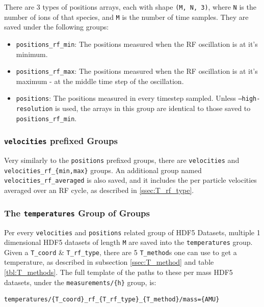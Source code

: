There are 3 types of positions arrays, each with shape \texttt{(M, N, 3)}, where \texttt{N} is the number of ions of that species, and \texttt{M} is the number of time samples. They are saved under the following groups:

\begin{itemize}
	\item \texttt{positions\_rf\_min}: The positions measured when the RF oscillation is at it's minimum.
	\item \texttt{positions\_rf\_max}: The positions measured when the RF oscillation is at it's maximum - at the middle time step of the oscillation.
	\item \texttt{positions}: The positions measured in every timestep sampled. Unless \texttt{--high-resolution} is used, the arrays in this group are identical to those saved to \texttt{positions\_rf\_min}.
\end{itemize}

\subsubsection{\texttt{velocities} prefixed Groups}

Very similarly to the \texttt{positions} prefixed groups, there are \texttt{velocities} and \texttt{velocities\_rf\_\{min,max\}} groups. An additional group named \texttt{velocities\_rf\_averaged} is also saved, and it includes the per particle velocities averaged over an RF cycle, as described in \ref{ssec:T_rf_type}.

\subsubsection{The \texttt{temperatures} Group of Groups}

Per every \texttt{velocities} and \texttt{positions} related group of HDF5 Datasets, multiple 1 dimensional HDF5 datasets of length \texttt{M} are saved into the \texttt{temperatures} group. Given a \texttt{T\_coord} \& \texttt{T\_rf\_type}, there are 5 \texttt{T\_method}s one can use to get a temperature, as described in subsection \ref{ssec:T_method} and table \ref{tbl:T_methods}. The full template of the paths to these per mass HDF5 datasets, under the \texttt{measurements/\{h\}} group, is:

\begin{verbatim}
temperatures/{T_coord}_rf_{T_rf_type}_{T_method}/mass={AMU}
\end{verbatim}

